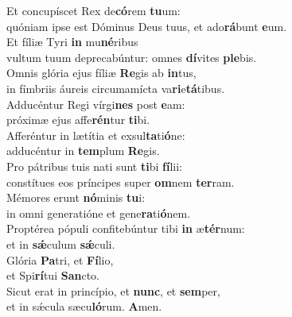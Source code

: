 \oddverse Et concupíscet Rex de\textbf{có}rem \textbf{tu}um:~\*\\
\oddverse quóniam ipse est Dóminus Deus tuus, et ado\textbf{rá}bunt \textbf{e}um.\\
\evenverse Et fíliæ Tyri \textbf{in} mu\textbf{né}ribus~\*\\
\evenverse vultum tuum deprecabúntur: omnes \textbf{dí}vites \textbf{ple}bis.\\
\oddverse Omnis glória ejus fíliæ \textbf{Re}gis ab \textbf{in}tus,~\*\\
\oddverse in fímbriis áureis circumamícta va\textbf{ri}e\textbf{tá}tibus.\\
\evenverse Adducéntur Regi vírgi\textbf{nes} post \textbf{e}am:~\*\\
\evenverse próximæ ejus affe\textbf{rén}tur \textbf{ti}bi.\\
\oddverse Afferéntur in lætítia et exsul\textbf{ta}ti\textbf{ó}ne:~\*\\
\oddverse adducéntur in \textbf{tem}plum \textbf{Re}gis.\\
\evenverse Pro pátribus tuis nati sunt \textbf{ti}bi \textbf{fí}lii:~\*\\
\evenverse constítues eos príncipes super \textbf{om}nem \textbf{ter}ram.\\
\oddverse Mémores erunt \textbf{nó}minis \textbf{tu}i:~\*\\
\oddverse in omni generatióne et gene\textbf{ra}ti\textbf{ó}nem.\\
\evenverse Proptérea pópuli confitebúntur tibi \textbf{in} æ\textbf{tér}num:~\*\\
\evenverse et in \textbf{sǽ}culum \textbf{sǽ}culi.\\
\oddverse Glória \textbf{Pa}tri, et \textbf{Fí}lio,~\*\\
\oddverse et Spi\textbf{rí}tui \textbf{San}cto.\\
\evenverse Sicut erat in princípio, et \textbf{nunc}, et \textbf{sem}per,~\*\\
\evenverse et in sǽcula sæcu\textbf{ló}rum. \textbf{A}men.\\
